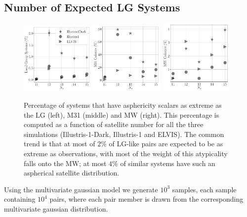 \documentclass[a4paper,fleqn,usenatbib]{mnras}
\begin{document}
\subsection{Number of Expected LG Systems}




\begin{figure}
\centering
\includegraphics[width=0.32\textwidth]{LG_numbers.pdf}
\includegraphics[width=0.32\textwidth]{M31_numbers.pdf}
\includegraphics[width=0.32\textwidth]{MW_numbers.pdf}
\caption{
Percentage of systems that have asphericity scalars as extreme as the
LG (left), M31 (middle) and MW (right).  
This percentage is computed as a function of satellite number for all
the three simulations (Illustris-1-Dark, Illustris-1 and ELVIS).
The common trend is that at most of $2\%$ of LG-like pairs are expected to
be as extreme as observations, with most of the weight of this
atypicality falls onto the MW; at most $4\%$ of similar systems have
such an aspherical satellite distribution. 
\label{fig:expected_number}}
\end{figure}


Using the multivariate gaussian model we generate $10^3$ samples, each
sample containing $10^4$ pairs, where each pair member is drawn from
the corresponding multivariate gaussian distribution. 
\end{document}
